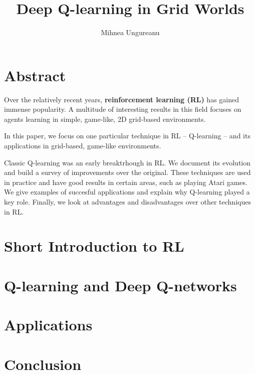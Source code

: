 \documentclass[12pt]{report}
\title{
    {Deep Q-learning in Grid Worlds}
}
\author{Mihnea Ungureanu}
\begin{document}
\maketitle

\chapter*{Abstract}
Over the relatively recent years, \textbf{reinforcement learning (RL)} has gained immense popularity.
A multitude of interesting results in this field focuses on agents learning in simple, game-like, 2D grid-based environments.

In this paper, we focus on one particular technique in RL -- Q-learning -- and its applications in grid-based, game-like environments.

Classic Q-learning was an early breaktrhough in RL.
We document its evolution and build a survey of improvements over the original.
These techniques are used in practice and have good results in certain areas, such as playing Atari games.
We give examples of succesful applications and explain why Q-learning played a key role.
Finally, we look at advantages and disadvantages over other techniques in RL.

\tableofcontents

\chapter{Short Introduction to RL}


\chapter{Q-learning and Deep Q-networks}


\chapter{Applications}


\chapter{Conclusion}



\end{document}
